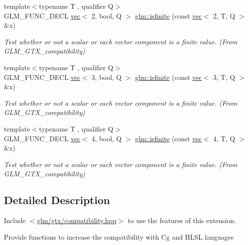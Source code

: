 \begin{DoxyCompactItemize}
\mbox{\label{group__gtx__compatibility_ga8e76dc3e406ce6a4155c2b12a2e4b084}} 
{\footnotesize template$<$typename T , qualifier Q$>$ }\\G\+L\+M\+\_\+\+F\+U\+N\+C\+\_\+\+D\+E\+CL \hyperlink{structglm_1_1vec}{vec}$<$ 2, bool, Q $>$ \hyperlink{group__gtx__compatibility_ga8e76dc3e406ce6a4155c2b12a2e4b084}{glm\+::isfinite} (const \hyperlink{structglm_1_1vec}{vec}$<$ 2, T, Q $>$ \&x)
\begin{DoxyCompactList}\small\item\em Test whether or not a scalar or each vector component is a finite value. (From G\+L\+M\+\_\+\+G\+T\+X\+\_\+compatibility) \end{DoxyCompactList}\item 
\mbox{\label{group__gtx__compatibility_ga929ef27f896d902c1771a2e5e150fc97}} 
{\footnotesize template$<$typename T , qualifier Q$>$ }\\G\+L\+M\+\_\+\+F\+U\+N\+C\+\_\+\+D\+E\+CL \hyperlink{structglm_1_1vec}{vec}$<$ 3, bool, Q $>$ \hyperlink{group__gtx__compatibility_ga929ef27f896d902c1771a2e5e150fc97}{glm\+::isfinite} (const \hyperlink{structglm_1_1vec}{vec}$<$ 3, T, Q $>$ \&x)
\begin{DoxyCompactList}\small\item\em Test whether or not a scalar or each vector component is a finite value. (From G\+L\+M\+\_\+\+G\+T\+X\+\_\+compatibility) \end{DoxyCompactList}\item 
\mbox{\label{group__gtx__compatibility_ga19925badbe10ce61df1d0de00be0b5ad}} 
{\footnotesize template$<$typename T , qualifier Q$>$ }\\G\+L\+M\+\_\+\+F\+U\+N\+C\+\_\+\+D\+E\+CL \hyperlink{structglm_1_1vec}{vec}$<$ 4, bool, Q $>$ \hyperlink{group__gtx__compatibility_ga19925badbe10ce61df1d0de00be0b5ad}{glm\+::isfinite} (const \hyperlink{structglm_1_1vec}{vec}$<$ 4, T, Q $>$ \&x)
\begin{DoxyCompactList}\small\item\em Test whether or not a scalar or each vector component is a finite value. (From G\+L\+M\+\_\+\+G\+T\+X\+\_\+compatibility) \end{DoxyCompactList}\end{DoxyCompactItemize}


\subsection{Detailed Description}
Include $<$\hyperlink{compatibility_8hpp}{glm/gtx/compatibility.\+hpp}$>$ to use the features of this extension.

Provide functions to increase the compatibility with Cg and H\+L\+SL languages 